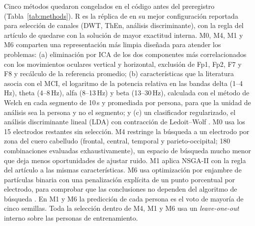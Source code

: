 Cinco métodos quedaron congelados en el código antes del preregistro (Tabla~\ref{tab:methods}). R es la réplica de \citet{aljalal2024} en su mejor configuración reportada para selección de canales (DWT, ThEn, análisis discriminante), con la regla del artículo de quedarse con la solución de mayor exactitud interna. M0, M4, M1 y M6 comparten una representación más limpia diseñada para atender los problemas: (a) eliminación por ICA de los dos componentes más correlacionados con los movimientos oculares vertical y horizontal, exclusión de Fp1, Fp2, F7 y F8 y recálculo de la referencia promedio; (b) características que la literatura asocia con el MCI, el logaritmo de la potencia relativa en las bandas delta (1--4\,Hz), theta (4--8\,Hz), alfa (8--13\,Hz) y beta (13--30\,Hz), calculada con el método de Welch \citep{welch1967} en cada segmento de 10\,s y promediada por persona, para que la unidad de análisis sea la persona y no el segmento; y (c) un clasificador regularizado, el análisis discriminante lineal (LDA) con contracción de Ledoit--Wolf \citep{ledoit2004}. M0 usa los 15 electrodos restantes sin selección. M4 restringe la búsqueda a un electrodo por zona del cuero cabelludo (frontal, central, temporal y parieto-occipital; 180 combinaciones evaluadas exhaustivamente), un espacio de búsqueda mucho menor que deja menos oportunidades de ajustar ruido. M1 aplica NSGA-II con la regla del artículo a las mismas características. M6 usa optimización por enjambre de partículas binaria \citep{kennedy1997} con una penalización explícita de un punto porcentual por electrodo, para comprobar que las conclusiones no dependen del algoritmo de búsqueda \citep{wolpert1997}. En M1 y M6 la predicción de cada persona es el voto de mayoría de cinco semillas. Toda la selección dentro de M4, M1 y M6 usa un \emph{leave-one-out} interno sobre las personas de entrenamiento.


